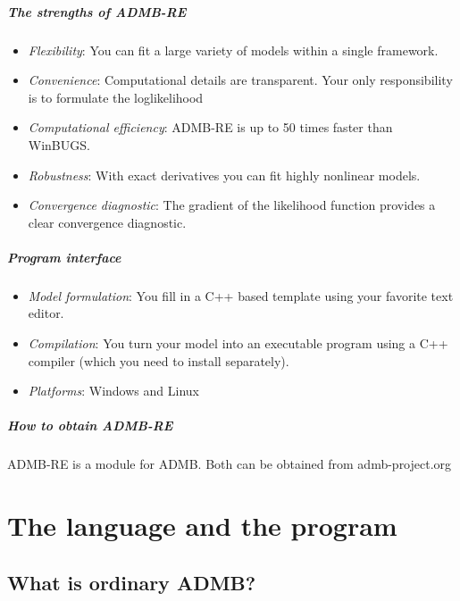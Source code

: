 \documentclass[12pt,letter,reqno]{book}
\begin{document}
\paragraph{The strengths of ADMB-RE}

\begin{itemize}
\item \textit{Flexibility}: You can fit a large variety of models within a single framework.
\item \textit{Convenience}: Computational details are transparent. Your only
responsibility is to formulate the loglikelihood
\item \textit{Computational efficiency}: ADMB-RE is up to 50 times faster
than WinBUGS.
\item \textit{Robustness}: With exact derivatives you can fit highly nonlinear models.
\item \textit{Convergence diagnostic}: The gradient of the likelihood
function provides a clear convergence diagnostic.
\end{itemize}

\paragraph{Program interface}

\begin{itemize}
\item\textit{Model formulation}: You fill in a C++ based template
using your favorite text editor.

\item \textit{Compilation}: You turn your model into an executable program using
a  C++ compiler (which you need to install separately).

\item\textit{Platforms}: Windows and Linux
\end{itemize}

\paragraph{How to obtain ADMB-RE}

ADMB-RE is a module for ADMB. Both can be obtained from
admb-project.org

\chapter{The language and the program}

\section{What is ordinary ADMB?}
\end{document}
